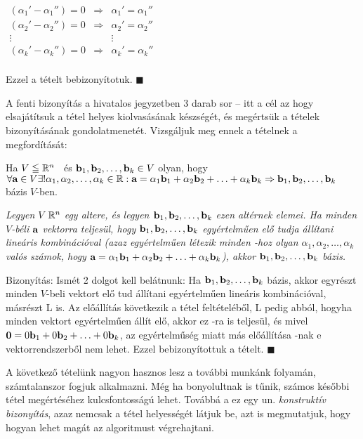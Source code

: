 \documentclass[a4paper,11.5pt]{article}
\begin{document}
	\begin{center}
		$\begin{matrix}
			(\alpha_1'-\alpha_1'')=0&\Rightarrow&\alpha_1'=\alpha_1''\\
			(\alpha_2'-\alpha_2'')=0&\Rightarrow&\alpha_2'=\alpha_2''\\
			\vdots&&\vdots\\
			(\alpha_k'-\alpha_k'')=0&\Rightarrow&\alpha_k'=\alpha_k''\\
		\end{matrix}$
	\end{center}
	
	Ezzel a tételt bebizonyítotuk. $\blacksquare$ 
	
	A fenti bizonyítás a hivatalos jegyzetben 3 darab sor -- itt a cél az hogy elsajátítsuk a tétel helyes kiolvasásának készségét, és megértsük a tételek bizonyításának gondolatmenetét. Vizsgáljuk meg ennek a tételnek a megfordítását:\\
	
	\begin{theorem}
		Ha $V\leqq \mathbb{R}^{n}$ ~és $ \textbf{b}_1, \textbf{b}_2, \ldots , \textbf{b}_k \in V$ olyan, hogy $\forall \textbf{a} \in V\\
		\exists! \alpha_1, \alpha_2, \ldots, \alpha_k \in \mathbb{R}: \textbf{a} =\alpha_1\textbf{b}_1+\alpha_2\textbf{b}_2+\ldots+\alpha_k\textbf{b}_k \Rightarrow \textbf{b}_1, \textbf{b}_2, \ldots , \textbf{b}_k$ bázis $V$-ben.
	\end{theorem}
	
	\emph{Legyen $V$ $\mathbb{R}^{n}$ egy altere, és legyen $ \textbf{b}_1, \textbf{b}_2, \ldots , \textbf{b}_k$ ezen altérnek elemei. Ha minden $V$-béli $\textbf{a}$ vektorra teljesül, hogy $ \textbf{b}_1, \textbf{b}_2, \ldots , \textbf{b}_k$ egyértelműen elő tudja állítani lineáris kombinációval (azaz egyértelműen létezik minden \a-hoz olyan $\alpha_1, \alpha_2, \ldots, \alpha_k$ valós számok, hogy $\textbf{a}=\alpha_1\textbf{b}_1+\alpha_2\textbf{b}_2+\ldots+\alpha_k\textbf{b}_k$), akkor $ \textbf{b}_1, \textbf{b}_2, \ldots , \textbf{b}_k$ bázis.}
	
	\smallskip
	Bizonyítás: Ismét 2 dolgot kell belátnunk: Ha $ \textbf{b}_1, \textbf{b}_2, \ldots , \textbf{b}_k$ bázis, akkor egyrészt minden $V$-beli vektort elő tud állítani egyértelműen lineáris kombinációval, másrészt L is. Az előállítás következik a tétel feltételéből, L pedig abból, hogyha minden vektort egyértelműen állít elő, akkor ez \0-ra is teljesül, és mivel $\textbf{0}=0\textbf{b}_1+0\textbf{b}_2+\ldots+0\textbf{b}_k$, az egyértelműség miatt más előállítása \0-nak e vektorrendszerből nem lehet. Ezzel bebizonyítottuk a tételt. $\blacksquare$
	
	A következő tételünk nagyon hasznos lesz a további munkánk folyamán, számtalanszor fogjuk alkalmazni. Még ha bonyolultnak is tűnik, számos későbbi tétel megértéséhez kulcsfontosságú lehet. Továbbá a ez egy un. \textit{konstruktív bizonyítás}, azaz nemcsak a tétel helyességét látjuk be, azt is megmutatjuk, hogy hogyan lehet magát az algoritmust végrehajtani.
	
\end{document}
